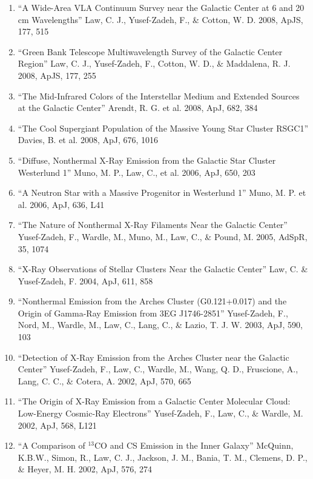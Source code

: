 \documentclass[12pt]{article}
\begin{document}
\begin{enumerate}
\item ``A Wide-Area VLA Continuum Survey near the Galactic Center at 6 and 20 cm Wavelengths'' Law, C. J., Yusef-Zadeh, F., \& Cotton, W. D. 2008, ApJS, 177, 515

\item ``Green Bank Telescope Multiwavelength Survey of the Galactic Center Region'' Law, C. J., Yusef-Zadeh, F., Cotton, W. D., \& Maddalena, R. J. 2008, ApJS, 177, 255

\item ``The Mid-Infrared Colors of the Interstellar Medium and Extended Sources at the Galactic Center'' Arendt, R. G. et al. 2008, ApJ, 682, 384

\item ``The Cool Supergiant Population of the Massive Young Star Cluster RSGC1'' Davies, B. et al. 2008, ApJ, 676, 1016

\item ``Diffuse, Nonthermal X-Ray Emission from the Galactic Star Cluster Westerlund 1'' Muno, M. P., Law, C., et al. 2006, ApJ, 650, 203

\item ``A Neutron Star with a Massive Progenitor in Westerlund 1'' Muno, M. P. et al. 2006, ApJ, 636, L41

\item ``The Nature of Nonthermal X-Ray Filaments Near the Galactic Center'' Yusef-Zadeh, F., Wardle, M., Muno, M., Law, C., \& Pound, M. 2005, AdSpR, 35, 1074

\item ``X-Ray Observations of Stellar Clusters Near the Galactic Center'' Law, C. \& Yusef-Zadeh, F. 2004, ApJ, 611, 858

\item ``Nonthermal Emission from the Arches Cluster (G0.121+0.017) and the Origin of Gamma-Ray Emission from 3EG J1746-2851'' Yusef-Zadeh, F., Nord, M., Wardle, M., Law, C., Lang, C., \& Lazio, T. J. W. 2003, ApJ, 590, 103

\item ``Detection of X-Ray Emission from the Arches Cluster near the Galactic Center'' Yusef-Zadeh, F., Law, C., Wardle, M., Wang, Q. D., Fruscione, A., Lang, C. C., \& Cotera, A. 2002, ApJ, 570, 665

\item ``The Origin of X-Ray Emission from a Galactic Center Molecular Cloud:  Low-Energy Cosmic-Ray Electrons'' Yusef-Zadeh, F., Law, C., \& Wardle, M. 2002, ApJ, 568, L121

\item ``A Comparison of $^{13}$CO and CS Emission in the Inner Galaxy'' McQuinn, K.B.W., Simon, R., Law, C. J., Jackson, J. M., Bania, T. M., Clemens, D. P., \& Heyer, M. H. 2002, ApJ, 576, 274
\end{enumerate}
\end{document}
